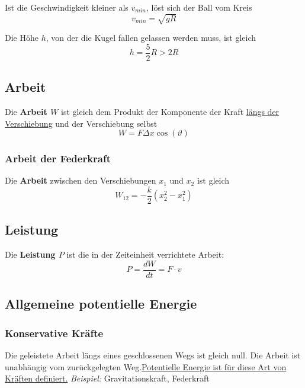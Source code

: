 \documentclass[7pt]{article}
\begin{document}
\begin{multicols*}{3}
Ist die Geschwindigkeit kleiner als $v_{min}$, l{\"o}st sich der Ball vom Kreis
\begin{equation*}
	v_{min} = \sqrt{gR}
\end{equation*}

Die H{\"o}he $h$, von der die Kugel fallen gelassen werden muss, ist gleich
\begin{equation*}
	h = \frac{5}{2}R > 2R
\end{equation*}

\subsection{Arbeit}

Die \textbf{Arbeit $W$} ist gleich dem Produkt der Komponente der Kraft \underline{l{\"a}ngs der Verschiebung} und der Verschiebung selbst
\begin{equation*}
	W = F\Delta x\cos(\vartheta)
\end{equation*}

\subsubsection{Arbeit der Federkraft}

Die \textbf{Arbeit} zwischen den Verschiebungen $x_1$ und $x_2$ ist gleich
\begin{equation*}
	W_{12} = -\frac{k}{2}(x_2^2-x_1^2)
\end{equation*}

\subsection{Leistung}

Die \textbf{Leistung $P$} ist die in der Zeiteinheit verrichtete Arbeit:
\begin{equation*}
	P = \frac{dW}{dt} = F \cdot v
\end{equation*}

\subsection{Allgemeine potentielle Energie}

\subsubsection{Konservative Kr{\"a}fte}
Die geleistete Arbeit l{\"a}ngs eines geschlossenen Wegs ist gleich null. Die Arbeit ist unabh{\"a}ngig vom zur{\"u}ckgelegten Weg.\underline{Potentielle Energie ist f{\"u}r diese Art von Kr{\"a}ften definiert.}\newline
\emph{Beispiel:} Gravitationskraft, Federkraft


\end{multicols*}
\end{document}
